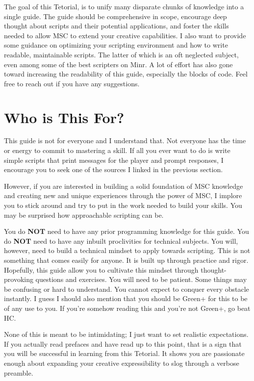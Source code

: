 \documentclass[oneside]{book}
\begin{document}
\begin{preface}
The goal of this Tetorial, is to unify many disparate chunks of knowledge into a single guide. The guide should be comprehensive in scope, encourage deep thought about scripts and their potential applications, and foster the skills needed to allow MSC to extend your creative capabilities. I also want to provide some guidance on optimizing your scripting environment and how to write readable, maintainable scripts. The latter of which is an oft neglected subject, even among some of the best scripters on Minr. A lot of effort has also gone toward increasing the readability of this guide, especially the blocks of code. Feel free to reach out if you have any suggestions.

\section*{Who is This For?}
This guide is not for everyone and I understand that. Not everyone has the time or energy to commit to mastering a skill. If all you ever want to do is write simple scripts that print messages for the player and prompt responses, I encourage you to seek one of the sources I linked in the previous section.

However, if you are interested in building a solid foundation of MSC knowledge and creating new and unique experiences through the power of MSC, I implore you to stick around and try to put in the work needed to build your skills. You may be surprised how approachable scripting can be.

You do \textbf{NOT} need to have any prior programming knowledge for this guide. You do \textbf{NOT} need to have any inbuilt proclivities for technical subjects. You will, however, need to build a technical mindset to apply towards scripting. This is not something that comes easily for anyone. It is built up through practice and rigor. Hopefully, this guide allow you to cultivate this mindset through thought-provoking questions and exercises. You will need to be patient. Some things may be confusing or hard to understand. You cannot expect to conquer every obstacle instantly. I guess I should also mention that you should be Green+ for this to be of any use to you. If you're somehow reading this and you're not Green+, go beat HC.

None of this is meant to be intimidating; I just want to set realistic expectations. If you actually read prefaces and have read up to this point, that is a sign that you will be successful in learning from this Tetorial. It shows you are passionate enough about expanding your creative expressibility to slog through a verbose preamble.


\end{preface}
\end{document}
